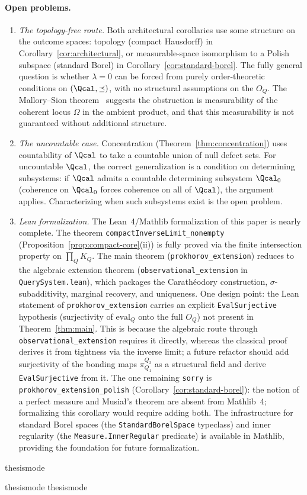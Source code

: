 \paragraph{Open problems.}

\begin{enumerate}
\item \emph{The topology-free route.}
Both architectural corollaries use some structure on the outcome
spaces: topology (compact Hausdorff) in Corollary~\ref{cor:architectural},
or measurable-space isomorphism to a Polish subspace (standard Borel)
in Corollary~\ref{cor:standard-borel}.  The fully general question
is whether $\lambda = 0$ can be forced from purely order-theoretic
conditions on $(\Qcal, \preceq)$, with no structural assumptions
on the $O_Q$.  The Mallory--Sion theorem~\cite{MallorySion1971}
suggests the obstruction is measurability of the coherent locus
$\Omega$ in the ambient product, and that this measurability is not
guaranteed without additional structure.

\item \emph{The uncountable case.}
Concentration (Theorem~\ref{thm:concentration}) uses countability
of $\Qcal$ to take a countable union of null defect sets.  For
uncountable $\Qcal$, the correct generalization is a condition on
determining subsystems: if $\Qcal$ admits a countable determining
subsystem $\Qcal_0$ (coherence on $\Qcal_0$ forces coherence on
all of $\Qcal$), the argument applies.  Characterizing when such
subsystems exist is the open problem.

\item \emph{Lean formalization.}
The Lean~4/Mathlib formalization of this paper is nearly complete.
The theorem \texttt{compactInverseLimit\_nonempty}
(Proposition~\ref{prop:compact-core}(ii))
is fully proved via the finite intersection property on
$\prod_Q K_Q$.  The main theorem (\texttt{prokhorov\_extension})
reduces to the algebraic extension theorem
(\texttt{observational\_extension} in \texttt{QuerySystem.lean}),
which packages the Carath\'eodory construction, $\sigma$-subadditivity,
marginal recovery, and uniqueness.  One design point: the Lean
statement of \texttt{prokhorov\_extension} carries an explicit
\texttt{EvalSurjective} hypothesis (surjectivity of $\mathrm{eval}_Q$
onto the full $O_Q$) not present in Theorem~\ref{thm:main}.  This
is because the algebraic route through
\texttt{observational\_extension} requires it directly, whereas the
classical proof derives it from tightness via the inverse limit;
a future refactor should add surjectivity of the bonding maps
$\pi^{Q_2}_{Q_1}$ as a structural field and derive
\texttt{EvalSurjective} from it.  The one remaining \texttt{sorry}
is \texttt{prokhorov\_extension\_polish}
(Corollary~\ref{cor:standard-borel}): the notion of a perfect measure
and Musia{\l}'s theorem are absent from Mathlib~4; formalizing this
corollary would require adding both.  The infrastructure for standard Borel spaces
(the \texttt{StandardBorelSpace} typeclass) and inner regularity
(the \texttt{Measure.InnerRegular} predicate) is available in
Mathlib, providing the foundation for future formalization.
\end{enumerate}

\ifcsname thesismode\endcsname\else


\fi

\ifcsname thesismode\endcsname\else
\ifcsname thesismode\endcsname\else\fi
\fi

